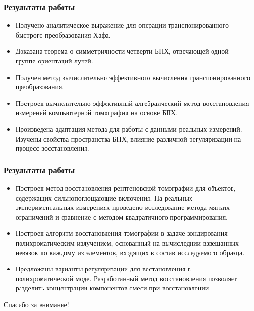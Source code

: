 \documentclass[12pt]{beamer}
\begin{document}
\begin{frame}
\frametitle{Результаты работы}
\begin{itemize}
  \item Получено аналитическое выражение для операции транспонированного быстрого преобразования Хафа. 
  \item Доказана теорема о симметричности четверти БПХ, отвечающей одной группе ориентаций лучей. 
  \item Получен метод вычислительно эффективного вычисления транспонированного преобразования.
  \item Построен вычислительно эффективный алгебраический метод восстановления измерений компьютерной томографии на основе БПХ.
  \item Произведена адаптация метода для работы с данными реальных измерений. Изучены свойства пространства БПХ, влияние различной регуляризации на процесс восстановления.
\end{itemize}
\end{frame}

\begin{frame}
\frametitle{Результаты работы}
\begin{itemize}
  \item Построен метод восстановления рентгеновской томографии для объектов, содержащих сильнопоглощающие включения. На реальных экспериментальных измерениях проведено исследование метода мягких ограничений и сравнение с методом квадратичного программирования.
  \item Построен алгоритм восстановления томографии в задаче зондирования полихроматическим излучением, основанный на вычиследнии взвешанных невязок по каждому из элементов, входящих в состав исследуемого образца. 
  \item Предложены варианты регуляризации для востановления в полихроматической моде. Разработанный метод восстановления позволяет разделить концентрации компонентов смеси при восстановлении.
\end{itemize}
\end{frame}

\begin{frame}
\centering
Спасибо за внимание!
\end{frame}
\end{document}
